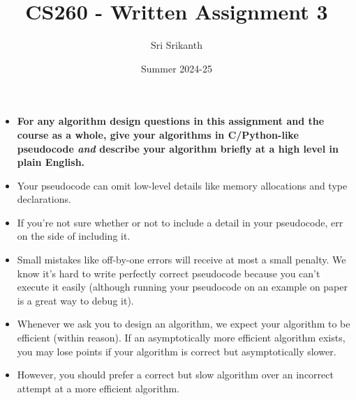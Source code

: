 \documentclass[addpoints]{exam}
\begin{document}
\title{CS260 - Written Assignment 3}
\author{Sri Srikanth}
\date{Summer 2024-25}
\maketitle



\newcommand{\limn}{\lim_{n \to \infty}}

\begin{itemize}
\item {\color{red} \textbf{For any algorithm design questions in this assignment and the course as a whole, give your algorithms in C/Python-like pseudocode \textit{and} describe your algorithm briefly at a high level in plain English.}}
\item Your pseudocode can omit low-level details like memory allocations and type declarations.
\item If you're not sure whether or not to include a detail in your pseudocode, err on the side of including it.
\item Small mistakes like off-by-one errors will receive at most a small penalty. We know it's hard to write perfectly correct pseudocode because you can't execute it easily (although running your pseudocode on an example on paper is a great way to debug it).
\item Whenever we ask you to design an algorithm, we expect your algorithm to be efficient (within reason). If an asymptotically more efficient algorithm exists, you may lose points if your algorithm is correct but asymptotically slower.
\item However, you should prefer a correct but slow algorithm over an incorrect attempt at a more efficient algorithm.
\end{itemize}
\end{document}
